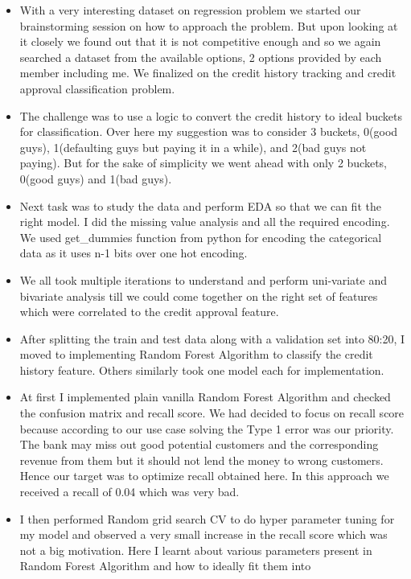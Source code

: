 \documentclass[
]{article}
\begin{document}
\begin{itemize}
\item
  With a very interesting dataset on regression problem we started our
  brainstorming session on how to approach the problem. But upon looking
  at it closely we found out that it is not competitive enough and so we
  again searched a dataset from the available options, 2 options
  provided by each member including me. We finalized on the credit
  history tracking and credit approval classification problem.
\item
  The challenge was to use a logic to convert the credit history to
  ideal buckets for classification. Over here my suggestion was to
  consider 3 buckets, 0(good guys), 1(defaulting guys but paying it in a
  while), and 2(bad guys not paying). But for the sake of simplicity we
  went ahead with only 2 buckets, 0(good guys) and 1(bad guys).
\item
  Next task was to study the data and perform EDA so that we can fit the
  right model. I did the missing value analysis and all the required
  encoding. We used get\_dummies function from python for encoding the
  categorical data as it uses n-1 bits over one hot encoding.
\item
  We all took multiple iterations to understand and perform uni-variate
  and bivariate analysis till we could come together on the right set of
  features which were correlated to the credit approval feature.
\item
  After splitting the train and test data along with a validation set
  into 80:20, I moved to implementing Random Forest Algorithm to
  classify the credit history feature. Others similarly took one model
  each for implementation.
\item
  At first I implemented plain vanilla Random Forest Algorithm and
  checked the confusion matrix and recall score. We had decided to focus
  on recall score because according to our use case solving the Type 1
  error was our priority. The bank may miss out good potential customers
  and the corresponding revenue from them but it should not lend the
  money to wrong customers. Hence our target was to optimize recall
  obtained here. In this approach we received a recall of 0.04 which was
  very bad.
\item
  I then performed Random grid search CV to do hyper parameter tuning
  for my model and observed a very small increase in the recall score
  which was not a big motivation. Here I learnt about various parameters
  present in Random Forest Algorithm and how to ideally fit them into

\end{itemize}
\end{document}
